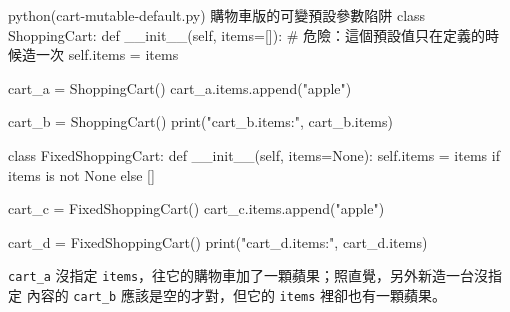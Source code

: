 \begin{example}{python}{(cart-mutable-default.py) 購物車版的可變預設參數陷阱}
class ShoppingCart:
    def __init__(self, items=[]):  # 危險：這個預設值只在定義的時候造一次
        self.items = items


cart_a = ShoppingCart()
cart_a.items.append("apple")

cart_b = ShoppingCart()
print("cart_b.items:", cart_b.items)


class FixedShoppingCart:
    def __init__(self, items=None):
        self.items = items if items is not None else []


cart_c = FixedShoppingCart()
cart_c.items.append("apple")

cart_d = FixedShoppingCart()
print("cart_d.items:", cart_d.items)
\end{example}


\texttt{cart\_a} 沒指定 \texttt{items}，往它的購物車加了一顆蘋果；照直覺，另外新造一台沒指定
內容的 \texttt{cart\_b} 應該是空的才對，但它的 \texttt{items} 裡卻也有一顆蘋果。


